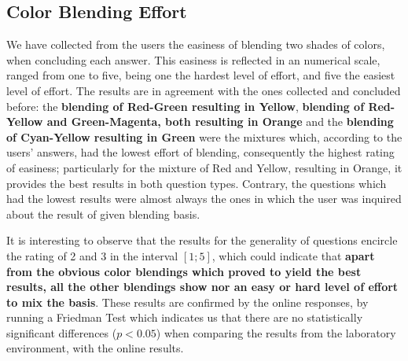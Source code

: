 \subsection{Color Blending Effort}
%
We have collected from the users the easiness of blending two shades of colors, when concluding each
answer. This easiness is reflected in an numerical scale, ranged from one to five, being one the hardest
level of effort, and five the easiest level of effort. The results are in agreement with the ones collected
and concluded before: the \textbf{blending of Red-Green resulting in Yellow}, \textbf{blending of Red-Yellow
and Green-Magenta, both resulting in Orange} and the \textbf{blending of Cyan-Yellow resulting in Green} were
the mixtures which, according to the users' answers, had the lowest effort of blending, consequently the
highest rating of easiness; particularly for the mixture of Red and Yellow, resulting in Orange, it provides
the best results in both question types. Contrary, the questions which had the lowest results were almost always the ones in which the user was inquired about the result of given blending basis. \par
%
It is interesting to observe that the results for the generality of questions encircle the rating of 2 and 3
in the interval $[1 ; 5]$, which could indicate that \textbf{apart from the obvious color blendings which
proved to yield the best results, all the other blendings show nor an easy or hard level of effort to mix
the basis}. These results are confirmed by the online responses, by running a Friedman Test which indicates
us that there are no statistically significant differences ($p < 0.05$) when comparing the results from the
laboratory environment, with the online results.
%
